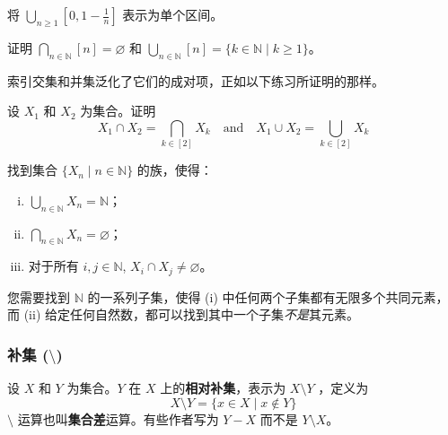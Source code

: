 \begin{exercise}
将 $\displaystyle\bigcup_{n \ge 1} [0,1-\frac{1}{n}]$ 表示为单个区间。
\end{exercise}

\begin{exercise}
证明 $\displaystyle\bigcap_{n \in \mathbb{N}} [n] = \varnothing$ 和 $\displaystyle\bigcup_{n \in \mathbb{N}} [n] = \{ k \in \mathbb{N} \mid k \ge 1 \}$。
\end{exercise}

索引交集和并集泛化了它们的成对项，正如以下练习所证明的那样。

\begin{exercise}
\label{exIndexedIntersectionUnionGeneralisePairwise}
设 $X_1$ 和 $X_2$ 为集合。证明
\[ X_1 \cap X_2 = \bigcap_{k \in [2]} X_k \quad \text{and} \quad X_1 \cup X_2 = \bigcup_{k \in [2]} X_k \]
\end{exercise}

\begin{exercise}
\label{exSubsetsFiniteIntersectionInhabitedInfiniteIntersectionEmpty}
找到集合 $\{ X_n \mid n \in \mathbb{N} \}$ 的族，使得：
\begin{enumerate}[(i)]
\item $\displaystyle\bigcup_{n \in \mathbb{N}} X_n = \mathbb{N}$；
\item $\displaystyle\bigcap_{n \in \mathbb{N}} X_n = \varnothing$；
\item 对于所有 $i,j \in \mathbb{N}$, $X_i \cap X_j \ne \varnothing$。
\end{enumerate}
\begin{backhint}
您需要找到 $\mathbb{N}$ 的一系列子集，使得 (i) 中任何两个子集都有无限多个共同元素，而 (ii) 给定任何自然数，都可以找到其中一个子集\textit{不是}其元素。
\end{backhint}
\end{exercise}

\subsubsection*{补集 ($\setminus$)}

\begin{definition}
\label{defRelativeComplement}
设 $X$ 和 $Y$ 为集合。$Y$ 在 $X$ 上的\textbf{相对补集}，表示为 $X \setminus Y$ ，定义为
\[ X \setminus Y = \{ x \in X \mid x \not \in Y \} \]
$\setminus$ 运算也叫\textbf{集合差}运算。有些作者写为 $Y - X$ 而不是 $Y \setminus X$。
\end{definition}

